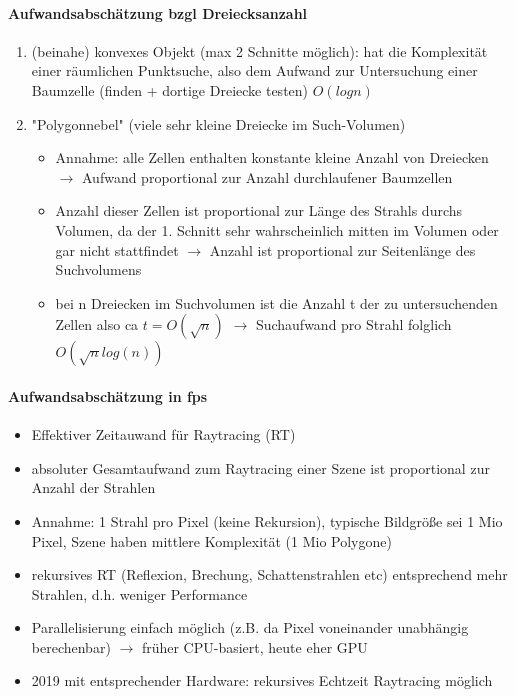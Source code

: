 \documentclass[10pt,landscape]{article}
\begin{document}
\begin{multicols}{3}
\paragraph{Aufwandsabschätzung bzgl Dreiecksanzahl}
\begin{enumerate}
  \item (beinahe) konvexes Objekt (max 2 Schnitte möglich): hat die Komplexität einer räumlichen Punktsuche, also dem Aufwand zur Untersuchung einer Baumzelle (finden + dortige Dreiecke testen) $O(log n)$
  \item "Polygonnebel" (viele sehr kleine Dreiecke im Such-Volumen)
        \begin{itemize}
          \item Annahme: alle Zellen enthalten konstante kleine Anzahl von Dreiecken $\rightarrow$ Aufwand proportional zur Anzahl durchlaufener Baumzellen
          \item Anzahl dieser Zellen ist proportional zur Länge des Strahls durchs Volumen, da der 1. Schnitt sehr wahrscheinlich mitten im Volumen oder gar nicht stattfindet $\rightarrow$ Anzahl ist proportional zur Seitenlänge des Suchvolumens
          \item bei n Dreiecken im Suchvolumen ist die Anzahl t der zu untersuchenden Zellen also ca $t=O(\sqrt{n})$ $\rightarrow$ Suchaufwand pro Strahl folglich $O(\sqrt{n} log (n))$
        \end{itemize}
\end{enumerate}

\paragraph{Aufwandsabschätzung in fps}
\begin{itemize}
  \item Effektiver Zeitauwand für Raytracing (RT)
  \item absoluter Gesamtaufwand zum Raytracing einer Szene ist proportional zur Anzahl der Strahlen
  \item Annahme: 1 Strahl pro Pixel (keine Rekursion), typische Bildgröße sei 1 Mio Pixel, Szene haben mittlere Komplexität (1 Mio Polygone)
  \item rekursives RT (Reflexion, Brechung, Schattenstrahlen etc) entsprechend mehr Strahlen, d.h. weniger Performance
  \item Parallelisierung einfach möglich (z.B. da Pixel voneinander unabhängig berechenbar) $\rightarrow$ früher CPU-basiert, heute eher GPU
  \item 2019 mit entsprechender Hardware: rekursives Echtzeit Raytracing möglich
\end{itemize}


\end{multicols}
\end{document}
